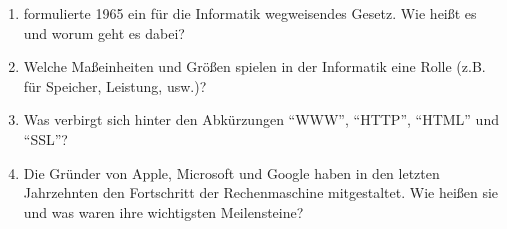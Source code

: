 \documentclass[10pt, a4paper]{scrartcl}
\begin{document}
\begin{enumerate}
	\item {} formulierte 1965 ein für die Informatik wegweisendes Gesetz. Wie heißt es und worum geht es dabei?
	\item Welche Maßeinheiten und Größen spielen in der Informatik eine Rolle (z.B. für Speicher, Leistung, usw.)?
	\item Was verbirgt sich hinter den Abkürzungen \enquote{WWW}, \enquote{HTTP}, \enquote{HTML} und \enquote{SSL}?
	\item Die Gründer von Apple, Microsoft und Google haben in den letzten Jahrzehnten den Fortschritt der Rechenmaschine mitgestaltet. Wie heißen sie und was waren ihre wichtigsten Meilensteine?
\end{enumerate}
\end{document}
